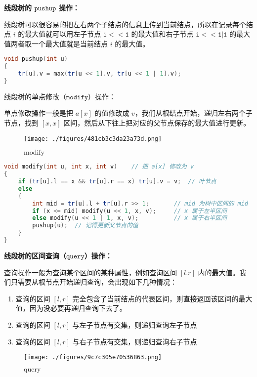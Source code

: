 \textbf{线段树的 $\texttt{pushup}$ 操作：}

线段树可以很容易的把左右两个子结点的信息上传到当前结点，所以在记录每个结点 $i$ 的最大值就可以用左子节点 $\mathtt{i<<1}$ 的最大值和右子节点 $\mathtt{i<<1|1}$ 的最大值两者取一个最大值就是当前结点 $i$ 的最大值。

\begin{lstlisting}[language=cpp]
void pushup(int u)
{
    tr[u].v = max(tr[u << 1].v, tr[u << 1 | 1].v);
}
\end{lstlisting}

线段树的单点修改（$\texttt{modify}$）操作：

单点修改操作一般是把 $a[x]$ 的值修改成 $v$，我们从根结点开始，递归左右两个子节点，找到 $[x, x]$ 区间，然后从下往上把对应的父节点保存的最大值进行更新。

\begin{figure}[ht]
\centering
\texttt{[image: ./figures/481cb3c3da23a73d.png]}
\caption{$\text{modify}$} \label{fig_STree_4}
\end{figure}


\begin{lstlisting}[language=cpp]
void modify(int u, int x, int v)    // 把 a[x] 修改为 v
{
    if (tr[u].l == x && tr[u].r == x) tr[u].v = v;  // 叶节点
    else
    {
        int mid = tr[u].l + tr[u].r >> 1;       // mid 为树中区间的 mid
        if (x <= mid) modify(u << 1, x, v);     // x 属于左半区间
        else modify(u << 1 | 1, x, v);          // x 属于右半区间
        pushup(u);  // 记得更新父节点的值
    }
}
\end{lstlisting}

\textbf{线段树的区间查询（$\texttt{query}$）操作：}

查询操作一般为查询某个区间的某种属性，例如查询区间 $[l. r]$ 内的最大值。我们只需要从根节点开始递归查询，会出现如下几种情况：

\begin{enumerate}
\item 查询的区间 $[l, r]$ 完全包含了当前结点的代表区间，则直接返回该区间的最大值，因为没必要再递归查询下去了。
\item 查询的区间 $[l, r]$ 与左子节点有交集，则递归查询左子节点
\item 查询的区间 $[l, r]$ 与右子节点有交集，则递归查询右子节点
\end{enumerate}

\begin{figure}[ht]
\centering
\texttt{[image: ./figures/9c7c305e70536863.png]}
\caption{$\text{query}$} \label{fig_STree_5}
\end{figure}

